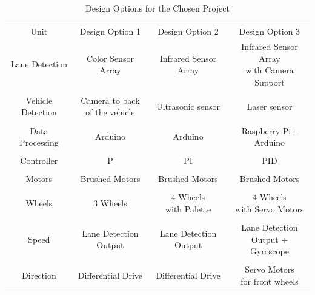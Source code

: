 \documentclass[a4paper,12pt]{article}
\begin{document}
	\begin{table}[H]
  \centering
 	\caption{Design Options for the Chosen Project}\vspace{-.2cm}
    \begin{tabular}{| c | c | c | c |}
    	\hline 
    	&&& \\
    	Unit & Design Option 1 & Design Option 2  & Design Option 3 \\ \hline
       Lane Detection  & Color Sensor Array & Infrared Sensor Array & \specialcell{ Infrared Sensor  Array \\ with  Camera Support}  \\ 
       & & & \\
       Vehicle Detection &   \specialcell{Camera to back \\of the vehicle }  & Ultrasonic sensor & Laser sensor   \\
       &&& \\ 
       Data Processing & Arduino & Arduino & \specialcell{Raspberry Pi+\\Arduino} \\ 
       &&& \\
       Controller & P & PI & PID \\ 
       &&&  \\
       Motors & Brushed Motors & Brushed Motors & Brushed Motors \\
       &&& \\
		Wheels & 3 Wheels  &  \specialcell{4 Wheels \\with Palette}  & \specialcell{4 Wheels \\with Servo Motors}   \\
		&&& \\
		Speed & \specialcell{Lane Detection \\Output} &  \specialcell{Lane Detection \\Output} & \specialcell{Lane Detection \\Output +  Gyroscope }   \\
		&&&\\
		Direction & Differential Drive  & Differential Drive & \specialcell{Servo Motors \\ for front wheels}  
       
       
       \\\hline
      
  \end{tabular}
  \label{tab:designs}
\end{table}			
				
\end{document}
